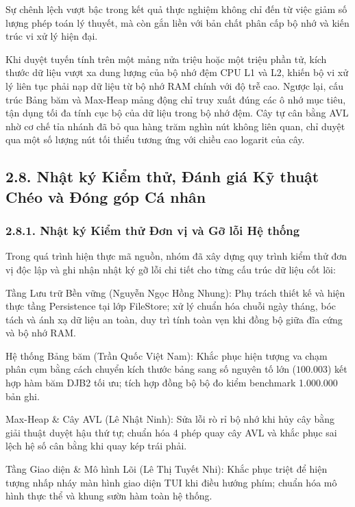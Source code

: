 \documentclass[14pt,a4paper]{extarticle}
\begin{document}
Sự chênh lệch vượt bậc trong kết quả thực nghiệm không chỉ đến từ việc giảm số lượng phép toán lý thuyết, mà còn gắn liền với bản chất phân cấp bộ nhớ và kiến trúc vi xử lý hiện đại.

Khi duyệt tuyến tính trên một mảng nửa triệu hoặc một triệu phần tử, kích thước dữ liệu vượt xa dung lượng của bộ nhớ đệm CPU L1 và L2, khiến bộ vi xử lý liên tục phải nạp dữ liệu từ bộ nhớ RAM chính với độ trễ cao. Ngược lại, cấu trúc Bảng băm và Max-Heap mảng động chỉ truy xuất đúng các ô nhớ mục tiêu, tận dụng tối đa tính cục bộ của dữ liệu trong bộ nhớ đệm. Cây tự cân bằng AVL nhờ cơ chế tỉa nhánh đã bỏ qua hàng trăm nghìn nút không liên quan, chỉ duyệt qua một số lượng nút tối thiểu tương ứng với chiều cao logarit của cây.

\subsection*{2.8. Nhật ký Kiểm thử, Đánh giá Kỹ thuật Chéo và Đóng góp Cá nhân}

\subsubsection*{2.8.1. Nhật ký Kiểm thử Đơn vị và Gỡ lỗi Hệ thống}

Trong quá trình hiện thực mã nguồn, nhóm đã xây dựng quy trình kiểm thử đơn vị độc lập và ghi nhận nhật ký gỡ lỗi chi tiết cho từng cấu trúc dữ liệu cốt lõi:

Tầng Lưu trữ Bền vững (Nguyễn Ngọc Hồng Nhung): Phụ trách thiết kế và hiện thực tầng Persistence tại lớp FileStore; xử lý chuẩn hóa chuỗi ngày tháng, bóc tách và ánh xạ dữ liệu an toàn, duy trì tính toàn vẹn khi đồng bộ giữa đĩa cứng và bộ nhớ RAM.

Hệ thống Bảng băm (Trần Quốc Việt Nam): Khắc phục hiện tượng va chạm phân cụm bằng cách chuyển kích thước bảng sang số nguyên tố lớn ($100.003$) kết hợp hàm băm DJB2 tối ưu; tích hợp đồng bộ bộ đo kiểm benchmark 1.000.000 bản ghi.

Max-Heap \& Cây AVL (Lê Nhật Ninh): Sửa lỗi rò rỉ bộ nhớ khi hủy cây bằng giải thuật duyệt hậu thứ tự; chuẩn hóa 4 phép quay cây AVL và khắc phục sai lệch hệ số cân bằng khi quay kép trái phải.

Tầng Giao diện \& Mô hình Lõi (Lê Thị Tuyết Nhi): Khắc phục triệt để hiện tượng nhấp nháy màn hình giao diện TUI khi điều hướng phím; chuẩn hóa mô hình thực thể và khung sườn hàm toàn hệ thống.
\end{document}
